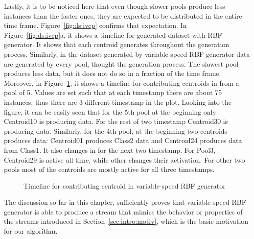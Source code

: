 Lastly, it is to be noticed here that even though slower pools produce less instances than the faster ones, they are expected to be distributed in the entire time frame. Figure~\ref{fig:ds:ivcp} confirms that expectation. In Figure~\ref{fig:ds:ivcp}a, it shows a timeline for generated dataset with RBF generator. It shows that each centroid generates throughout the generation process. Similarly, in the dataset generated by variable speed RBF generator data are generated by every pool, thought the generation process. The slowest pool produces less data, but it does not do so in a fraction of the time frame. Moreover, in Figure~\ref{fig:ds:ivsc}, it shows a timeline for contributing centroids in from a pool of 5. Values are set such that at each timestamp there are about 75 instances, thus there are 3 different timestamp in the plot. Looking into the figure, it can be easily seen that for the 5th pool at the beginning only Centroid10 is producing data. For the rest of two timestamp Centroid30 is producing data. Similarly, for the 4th pool, at the beginning two centroids produces data: Centroid01 produces Class2 data and Centroid24 produces data from Class1. It also changes in for the next two timestamp. For Pool3, Centroid29 is active all time, while other changes their activation. For other two pools most of the centroids are mostly active for all three timestamps.


\begin{figure}[htbp] 
    \begin{center}
        \caption{Timeline for contributing centroid in variable-speed RBF generator}
        \label{fig:ds:ivsc}
    \end{center}
\end{figure}



The discussion so far in this chapter, sufficiently proves that variable speed RBF generator is able to produce a stream that mimics the behavior or properties of the streams introduced in Section~\ref{sec:intro:motiv}, which is the basic motivation for our algorithm.
